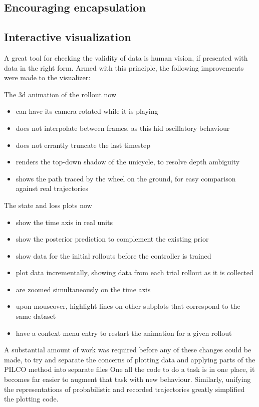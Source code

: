 \documentclass[main.tex]{subfiles}
\begin{document}
\subsection{Encouraging encapsulation}

\subsection{Interactive visualization}

A great tool for checking the validity of data is human vision, if presented with data in the right form.
Armed with this principle, the following improvements were made to the visualizer:
\begin{multicols}{2}
	\raggedcolumns
	\noindent
	The 3d animation of the rollout now
	\begin{itemize}[nosep]
		\item can have its camera rotated while it is playing
		\item does not interpolate between frames, as this hid oscillatory behaviour
		\item does not errantly truncate the last timestep
		\item renders the top-down shadow of the unicycle, to resolve depth ambiguity
		\item shows the path traced by the wheel on the ground, for easy comparison against real trajectories
	\end{itemize}
	\columnbreak
	\noindent
	The state and loss plots now
	\begin{itemize}[nosep]
		\item show the time axis in real units
		\item show the posterior prediction to complement the existing prior
		\item show data for the initial rollouts before the controller is trained
		\item plot data incrementally, showing data from each trial rollout as it is collected
		\item are zoomed simultaneously on the time axis
		\item upon mouseover, highlight lines on other subplots that correspond to the same dataset
		\item have a context menu entry to restart the animation for a given rollout
	\end{itemize}
\end{multicols}

A substantial amount of work was required before any of these changes could be made, to try and separate the concerns of plotting data and applying parts of the PILCO method into separate files
One all the code to do a task is in one place, it becomes far easier to augment that task with new behaviour.
Similarly, unifying the representations of probabilistic and recorded trajectories greatly simplified the plotting code.
\end{document}
